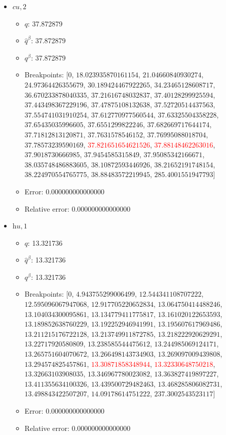 \documentclass{article}%
\begin{document}
\begin{itemize}
\begin{itemize}
		\item Error: 0.000000000000000%
		\item Relative error: 0.000000000000000%
	\end{itemize}%
	\item $\textit{cu},2$%
	\begin{itemize}%
		\item $q$: 37.872879%
		\item $\hat{q}^\beta$: 37.872879%
		\item $q^\beta$: 37.872879%
		\item Breakpoints: $[$$0$, $18.023935870161154$, $21.04660840930274$, $24.97364426355679$, $30.189424467922265$, $34.23465128608717$, $36.670233878040335$, $37.21616748032837$, $37.40128299925594$, $37.443498367229196$, $37.47875108132638$, $37.52720514437563$, $37.554741031910254$, $37.612770977560544$, $37.63325504358228$, $37.65435035996605$, $37.6551299822246$, $37.682669717644174$, $37.71812813120871$, $37.7631578546152$, $37.76995088018704$, $37.78573239590169$, \textcolor{red}{$37.821651654621526$}, \textcolor{red}{$37.88148462263016$}, $37.9018730666985$, $37.9454585315849$, $37.95085342166671$, $38.035748486883605$, $38.10872593446926$, $38.21652191748154$, $38.224970554765775$, $38.88483572219945$, $285.4001551947793$$]$%
		\item Error: 0.000000000000000%
		\item Relative error: 0.000000000000000%
	\end{itemize}%
	\item $\textit{hu},1$%
	\begin{itemize}%
		\item $q$: 13.321736%
		\item $\hat{q}^\beta$: 13.321736%
		\item $q^\beta$: 13.321736%
		\item Breakpoints: $[$$0$, $4.943755299006499$, $12.544341108707222$, $12.595096067947068$, $12.917705220652834$, $13.064750414488246$, $13.104034300095861$, $13.134779411775817$, $13.161020122653593$, $13.189852638760229$, $13.192252946941991$, $13.195607617969486$, $13.211215176722128$, $13.213749911872785$, $13.218222920629291$, $13.22717920580809$, $13.238585544475612$, $13.244985069124171$, $13.265751604070672$, $13.266498143734903$, $13.269097009439808$, $13.294574825457861$, \textcolor{red}{$13.30871858348944$}, \textcolor{red}{$13.32330648750218$}, $13.32663103908035$, $13.346967780023082$, $13.363827419897227$, $13.411355634100326$, $13.439500729482463$, $13.468285806082731$, $13.498843422507207$, $14.09178614751222$, $237.3002543523117$$]$%
		\item Error: 0.000000000000000%
		\item Relative error: 0.000000000000000%
	\end{itemize}%
\end{itemize}%
\end{document}

